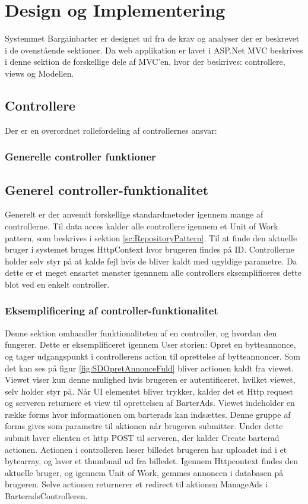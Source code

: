 \chapter{Design og Implementering}\label{ch:Design}
Systemmet Bargainbarter er designet ud fra de krav og analyser der er beskrevet i de ovenstående sektioner. Da web applikation er lavet i ASP.Net MVC beskrives i denne sektion de forskellige dele af MVC'en, hvor der beskrives: controllere, views og Modellen. 


\section{Controllere}
Der er en overordnet rollefordeling af controllernes ansvar: 




\subsection{Generelle controller funktioner}\label{sc:GenerelControl}
\section{Generel controller-funktionalitet}


Generelt er der anvendt forskellige standardmetoder igennem mange af controllerne. Til data acces kalder alle controllere igennem et Unit of Work pattern, som beskrives i sektion \ref{sc:RepositoryPattern}. Til at finde den aktuelle bruger i systemet bruges HttpContext hvor brugeren findes på ID. Controllerne holder selv styr på at kalde fejl hvis de bliver kaldt med ugyldige parametre. Da dette er et meget ensartet mønster igennnem alle controllers eksemplificeres dette blot ved en enkelt controller.

\subsection{Eksemplificering af controller-funktionalitet}
Denne sektion omhandler funktionaliteten af en controller, og hvordan den fungerer. Dette er eksemplificeret igennem User storien: Opret en bytteannonce, og tager udgangspunkt i controllerens action til oprettelse af bytteannoncer.
Som det kan ses på figur \ref{fig:SDOpretAnnonceFuld} bliver actionen kaldt fra viewet. Viewet viser kun denne mulighed hvis brugeren er autentificeret, hvilket viewet, selv holder styr på. Når UI elementet bliver trykker, kalder det et Http request og serveren returnere et view til oprettelsen af BarterAds. Viewet indeholder en række forms hvor informationen om barterads kan indsættes. Denne gruppe af forms gives som parametre til aktionen når brugeren submitter. Under dette submit laver clienten et http POST til serveren, der kalder Create barterad actionen. Actionen i controlleren læser billedet brugeren har uploadet ind i et bytearray, og laver et thumbnail ud fra billedet. Igennem Httpcontext findes den aktuelle bruger, og igennem Unit of Work, gemmes annoncen i databasen på brugeren. Selve actionen returnerer et redirect til aktionen ManageAds i BarteradsControlleren. 

